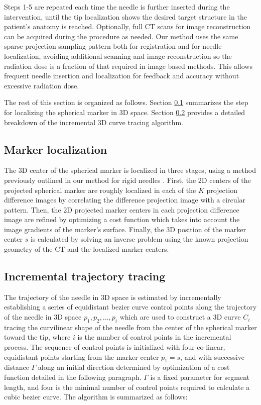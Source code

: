 Steps 1-5 are repeated each time the needle is further inserted during the intervention, until the tip localization shows the desired target structure in the patient's anatomy is reached. Optionally, full CT scans for image reconstruction can be acquired during the procedure as needed. Our method uses the same sparse projection sampling pattern both for registration and for needle localization, avoiding additional scanning and image reconstruction so the radiation dose is a fraction of that required in image based methods. This allows frequent needle insertion and localization for feedback and accuracy without excessive radiation dose.

The rest of this section is organized as follows.
Section \ref{markerloc} summarizes the step for localizing the spherical marker in 3D space.
Section \ref{inctracing} provides a detailed breakdown of the incremental 3D curve tracing algorithm.

\subsection{Marker localization} \label{markerloc}
The 3D center of the spherical marker is localized in three stages, using a method previously outlined in our method for rigid needles \cite{medan2017reduced}. 
First, the 2D centers of the projected spherical marker are roughly localized in each of the $K$ projection difference images by correlating the difference projection image with a circular pattern. 
Then, the 2D projected marker centers in each projection difference image are refined by optimizing a cost function which takes into account the image gradients of the marker's surface.
Finally, the 3D position of the marker center $s$ is calculated by solving an inverse problem using the known projection geometry of the CT and the localized marker centers.

\subsection{Incremental trajectory tracing} \label{inctracing}

The trajectory of the needle in 3D space is estimated by incrementally establishing a series of equidistant bezier curve control points along the trajectory of the needle in 3D space $p_1, p_2, ..., p_i$ which are used to construct a 3D curve $C_i$ tracing the curvilinear shape of the needle from the center of the spherical marker toward the tip, where $i$ is the number of control points in the incremental process. The sequence of control points is initialized with four co-linear, equidistant points starting from the marker center $p_1=s$, and with successive distance $\Gamma$ along an initial direction determined by optimization of a cost function detailed in the following paragraph. $\Gamma$ is a fixed parameter for segment length, and four is the minimal number of control points required to calculate a cubic bezier curve. The algorithm is summarized as follows:

